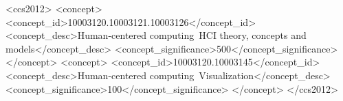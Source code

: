 \documentclass[manuscript,screen]{acmart}
\begin{document}
\begin{CCSXML}
<ccs2012>
   <concept>
       <concept_id>10003120.10003121.10003126</concept_id>
       <concept_desc>Human-centered computing~HCI theory, concepts and models</concept_desc>
       <concept_significance>500</concept_significance>
       </concept>
   <concept>
       <concept_id>10003120.10003145</concept_id>
       <concept_desc>Human-centered computing~Visualization</concept_desc>
       <concept_significance>100</concept_significance>
       </concept>
 </ccs2012>
\end{CCSXML}
\maketitle
\end{document}
